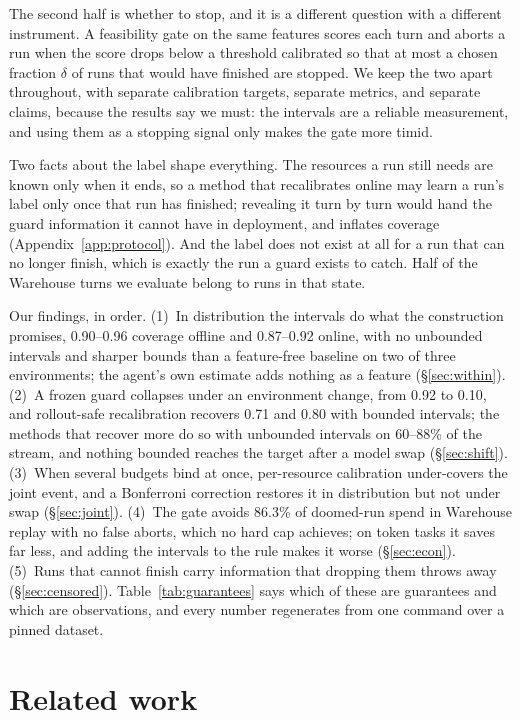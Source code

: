 \documentclass{article}
\begin{document}
The second half is whether to stop, and it is a different question with a different instrument. A feasibility gate on the same features scores each turn and aborts a run when the score drops below a threshold calibrated so that at most a chosen fraction $\delta$ of runs that would have finished are stopped. We keep the two apart throughout, with separate calibration targets, separate metrics, and separate claims, because the results say we must: the intervals are a reliable measurement, and using them as a stopping signal only makes the gate more timid.

Two facts about the label shape everything. The resources a run still needs are known only when it ends, so a method that recalibrates online may learn a run's label only once that run has finished; revealing it turn by turn would hand the guard information it cannot have in deployment, and inflates coverage (Appendix~\ref{app:protocol}). And the label does not exist at all for a run that can no longer finish, which is exactly the run a guard exists to catch. Half of the Warehouse turns we evaluate belong to runs in that state.

Our findings, in order. (1)~In distribution the intervals do what the construction promises, 0.90--0.96 coverage offline and 0.87--0.92 online, with no unbounded intervals and sharper bounds than a feature-free baseline on two of three environments; the agent's own estimate adds nothing as a feature (\S\ref{sec:within}). (2)~A frozen guard collapses under an environment change, from 0.92 to 0.10, and rollout-safe recalibration recovers 0.71 and 0.80 with bounded intervals; the methods that recover more do so with unbounded intervals on 60--88\% of the stream, and nothing bounded reaches the target after a model swap (\S\ref{sec:shift}). (3)~When several budgets bind at once, per-resource calibration under-covers the joint event, and a Bonferroni correction restores it in distribution but not under swap (\S\ref{sec:joint}). (4)~The gate avoids 86.3\% of doomed-run spend in Warehouse replay with no false aborts, which no hard cap achieves; on token tasks it saves far less, and adding the intervals to the rule makes it worse (\S\ref{sec:econ}). (5)~Runs that cannot finish carry information that dropping them throws away (\S\ref{sec:censored}). Table~\ref{tab:guarantees} says which of these are guarantees and which are observations, and every number regenerates from one command over a pinned dataset.

\section{Related work}
\label{sec:related}
\end{document}
